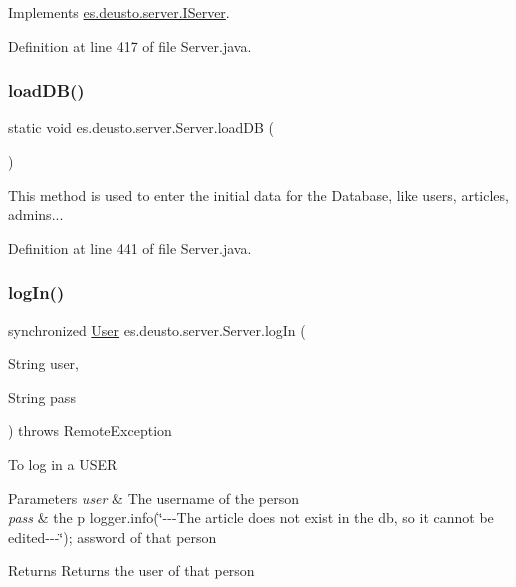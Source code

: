 Implements \hyperlink{interfacees_1_1deusto_1_1server_1_1_i_server_a27b2a5526387404d63d7fc6d0415acd4}{es.\+deusto.\+server.\+I\+Server}.



Definition at line 417 of file Server.\+java.

\mbox{\label{classes_1_1deusto_1_1server_1_1_server_a0517d84248cdc6489471f9e274b6d983}} 
\subsubsection{\texorpdfstring{load\+D\+B()}{loadDB()}}
{\footnotesize\ttfamily static void es.\+deusto.\+server.\+Server.\+load\+DB (\begin{DoxyParamCaption}{ }\end{DoxyParamCaption})\hspace{0.3cm}{\ttfamily [static]}}

This method is used to enter the initial data for the Database, like users, articles, admins... 

Definition at line 441 of file Server.\+java.

\mbox{\label{classes_1_1deusto_1_1server_1_1_server_a5a570da0fbfec7afdf56bd3648fc904f}} 
\subsubsection{\texorpdfstring{log\+In()}{logIn()}}
{\footnotesize\ttfamily synchronized \hyperlink{classes_1_1deusto_1_1server_1_1jdo_1_1_user}{User} es.\+deusto.\+server.\+Server.\+log\+In (\begin{DoxyParamCaption}\item[{String}]{user,  }\item[{String}]{pass }\end{DoxyParamCaption}) throws Remote\+Exception}

To log in a U\+S\+ER


\begin{DoxyParams}{Parameters}
{\em user} & The username of the person \\
\hline
{\em pass} & the p logger.\+info(\char`\"{}-\/-\/-\/\+The article does not exist in the db, so it
            cannot be edited-\/-\/-\/\char`\"{}); assword of that person \\
\hline
\end{DoxyParams}
\begin{DoxyReturn}{Returns}
Returns the user of that person 
\end{DoxyReturn}


